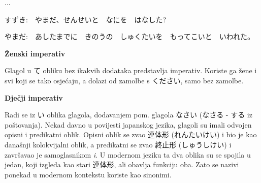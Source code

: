 \documentclass[12pt]{article}
\begin{document}
	...
	
	すずき:　やまだ、せんせいと　なにを　はなした?
	
	やまだ:　あしたまでに　きのうの　しゅくたいを　もってこいと　いわれた。
	
	\vspace{20pt}
	\normalsize \textbf{Ženski imperativ}
	\vspace{20pt}
	
	Glagol u て obliku bez ikakvih dodataka predstavlja imperativ. Koriste ga žene i svi koji se tako osjećaju, a dolazi od zamolbe s ください, samo bez zamolbe.
	
	\vspace{20pt}
	\normalsize \textbf{Dječji imperativ}
	\vspace{20pt}
	
	Radi se iz い oblika glagola, dodavanjem pom. glagola なさい (なさる - する iz poštovanja). Nekad davno u povijesti japanskog jezika, glagoli su imali odvojen opisni i predikatni oblik. Opisni oblik se zvao 連体形 (れんたいけい) i bio je kao današnji kolokvijalni oblik, a predikatni se zvao 終止形 (しゅうしけい) i završavao je samoglasnikom \textit{i}. U modernom jeziku ta dva oblika su se spojila u jedan, koji izgleda kao stari 連体形, ali obavlja funkciju oba. Zato se nazivi ponekad u modernom kontekstu koriste kao sinonimi.
	
\end{document}
